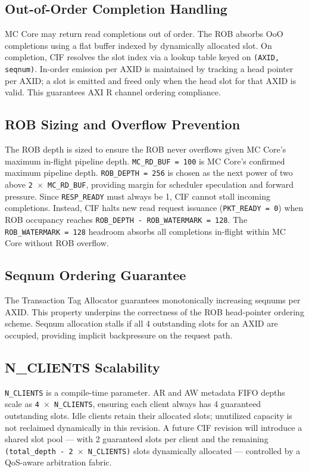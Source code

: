 \subsection{Out-of-Order Completion Handling}
MC Core may return read completions out of order. The ROB absorbs OoO completions using a flat buffer indexed by dynamically allocated slot. On completion, CIF resolves the slot index via a lookup table keyed on \texttt{(AXID, seqnum)}. In-order emission per AXID is maintained by tracking a head pointer per AXID; a slot is emitted and freed only when the head slot for that AXID is valid. This guarantees AXI R channel ordering compliance.

\subsection{ROB Sizing and Overflow Prevention}
The ROB depth is sized to ensure the ROB never overflows given MC Core's maximum in-flight pipeline depth. \texttt{MC\_RD\_BUF = 100} is MC Core's confirmed maximum pipeline depth. \texttt{ROB\_DEPTH = 256} is chosen as the next power of two above \texttt{2 $\times$ MC\_RD\_BUF}, providing margin for scheduler speculation and forward pressure. Since \texttt{RESP\_READY} must always be 1, CIF cannot stall incoming completions. Instead, CIF halts new read request issuance (\texttt{PKT\_READY = 0}) when ROB occupancy reaches \texttt{ROB\_DEPTH - ROB\_WATERMARK = 128}. The \texttt{ROB\_WATERMARK = 128} headroom absorbs all completions in-flight within MC Core without ROB overflow.

\subsection{Seqnum Ordering Guarantee}
The Transaction Tag Allocator guarantees monotonically increasing seqnums per AXID. This property underpins the correctness of the ROB head-pointer ordering scheme. Seqnum allocation stalls if all 4 outstanding slots for an AXID are occupied, providing implicit backpressure on the request path.

\subsection{N\_CLIENTS Scalability}
\texttt{N\_CLIENTS} is a compile-time parameter. AR and AW metadata FIFO depths scale as \texttt{4 $\times$ N\_CLIENTS}, ensuring each client always has 4 guaranteed outstanding slots. Idle clients retain their allocated slots; unutilized capacity is not reclaimed dynamically in this revision. A future CIF revision will introduce a shared slot pool — with 2 guaranteed slots per client and the remaining \texttt{(total\_depth - 2 $\times$ N\_CLIENTS)} slots dynamically allocated — controlled by a QoS-aware arbitration fabric.

